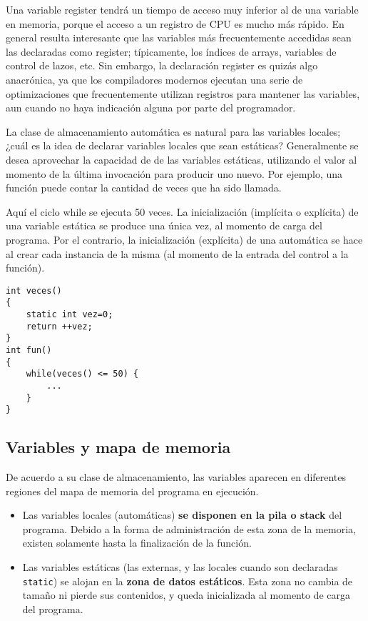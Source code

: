 Una variable register tendrá un tiempo de acceso muy inferior al de una variable en memoria, porque
el acceso a un registro de CPU es mucho más rápido. En general resulta interesante que las variables
más frecuentemente accedidas sean las declaradas como register; típicamente, los índices de arrays,
variables de control de lazos, etc. Sin embargo, la declaración register es quizás algo anacrónica, ya que los compiladores modernos ejecutan una serie de optimizaciones que frecuentemente utilizan registros para mantener las variables, aun cuando
no haya indicación alguna por parte del programador.


La clase de almacenamiento automática es natural para las variables locales; ¿cuál es la idea de declarar variables locales que sean estáticas? Generalmente se desea aprovechar la capacidad de  de las variables estáticas, utilizando el valor al momento de la última invocación para producir uno nuevo. Por ejemplo, una función puede contar la cantidad de veces que ha sido llamada.


\begin{ejemplo}
Aquí el ciclo while se ejecuta 50 veces. La inicialización (implícita o explícita) de una variable estática se produce una única vez, al momento de carga del programa. Por el contrario, la inicialización (explícita) de una automática se hace al crear cada instancia de la misma (al momento de la entrada del control a la función).

\begin{lstlisting}
int veces()
{
	static int vez=0;
	return ++vez;
}
int fun()
{
	while(veces() <= 50) {
		...
	}
}
\end{lstlisting}
\end{ejemplo}







\subsection{Variables y mapa de memoria}

De acuerdo a su clase de almacenamiento, las variables aparecen en diferentes regiones del mapa de
memoria del programa en ejecución.
\begin{itemize}
	\item Las variables locales (automáticas) \textbf{se disponen en la pila o stack} del programa.
Debido a la forma de administración de esta zona de la
memoria, existen solamente hasta la finalización de la
función.
\item Las variables estáticas (las externas, y las locales cuando
son declaradas \lstinline{static}) se alojan en la \textbf{zona de datos
estáticos}. Esta zona no cambia de tamaño ni pierde sus
contenidos, y queda inicializada al momento de carga del
programa.
\end{itemize}


